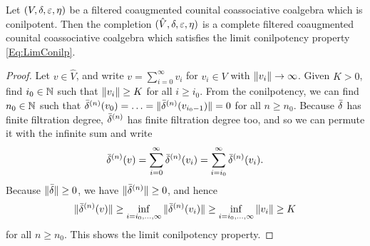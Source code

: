 \documentclass[\MainFolder/Text.tex]{subfiles}
\begin{document}
\begin{Lemma}\label{Lem:SymAlgLimConilp}
Let $(V,\delta,\varepsilon,\eta)$ be a filtered coaugmented counital coassociative coalgebra which is conilpotent. Then the completion $(\hat{V},\delta,\varepsilon,\eta)$ is a complete filtered coaugmented counital coassociative coalgebra which satisfies the limit conilpotency property \eqref{Eq:LimConilp}.
\end{Lemma}
\begin{proof}
Let $v\in \hat{V}$, and write $v = \sum_{i=0}^\infty v_i$ for $v_i\in V$ with $\| v_i \| \to \infty$. Given $K>0$, find $i_0\in \mathbb{N}$ such that $\| v_i \|\ge K$ for all $i\ge i_0$. From the conilpotency, we can find $n_0\in \mathbb{N}$ such that $\bar{\delta}^{(n)}(v_0) = \dotsc = \| \bar{\delta}^{(n)}(v_{i_0-1}) \| = 0$ for all $n\ge n_0$. Because $\bar{\delta}$ has finite filtration degree, $\bar{\delta}^{(n)}$ has finite filtration degree too, and so we can permute it with the infinite sum and write 
\[ \bar{\delta}^{(n)}(v) = \sum_{i=0}^\infty \bar{\delta}^{(n)}(v_i) = \sum_{i=i_0}^\infty \bar{\delta}^{(n)}(v_i). \]
Because $\| \bar{\delta} \| \ge 0$, we have $\| \bar{\delta}^{(n)} \| \ge 0$, and hence 
\[ \| \bar{\delta}^{(n)}(v) \| \ge \inf_{i=i_0,\dotsc,\infty}\| \bar{\delta}^{(n)}(v_i) \| \ge \inf_{i=i_0,\dotsc,\infty} \| v_i \| \ge K \]
for all $n\ge n_0$. This shows the limit conilpotency property.
\end{proof}
\end{document}
